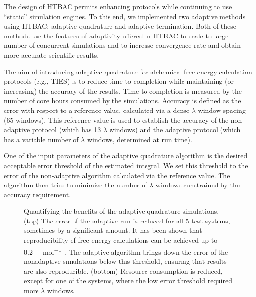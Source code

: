 The design of HTBAC permits enhancing protocols while continuing to use
``static'' simulation engines. To this end, we implemented two adaptive
methods using HTBAC: adaptive quadrature and adaptive termination. Both of
these methods use the features of adaptivity offered in HTBAC to scale to
large number of concurrent simulations and to increase convergence rate and
obtain more accurate scientific results.



The aim of introducing adaptive quadrature for alchemical free energy
calculation protocols (e.g., TIES) is to reduce time to completion while
maintaining (or increasing) the accuracy of the results. Time to completion
is measured by the number of core hours consumed by the simulations. Accuracy
is defined as the error with respect to a reference value, calculated via a
dense $\lambda$ window spacing (65 windows). This reference value is used to
establish the accuracy of the non-adaptive protocol (which has 13 $\lambda$
windows) and the adaptive protocol (which has a variable number of $\lambda$
windows, determined at run time).

One of the input parameters of the adaptive quadrature algorithm is the
desired acceptable error threshold of the estimated integral. We set this
threshold to the error of the non-adaptive algorithm calculated via the
reference value. The algorithm then tries to minimize the number of $\lambda$
windows constrained by the accuracy requirement.

\begin{figure}
  \caption{Quantifying the benefits of the adaptive quadrature simulations.
  (top) The error of the adaptive run is reduced for all 5 test systems,
  sometimes by a significant amount. It has been shown that reproducibility
  of free energy calculations can be achieved up to
  \SI{0.2}{\kilo\calorie\per\mole}~\cite{Loeffler2018}. The adaptive
  algorithm brings down the error of the nonadaptive simulations below this
  threshold, ensuring that results are also reproducible. (bottom) Resource
  consumption is reduced, except for one of the systems, where the low error
  threshold required more $\lambda$ windows.}\label{fig:savings}
\up{}
\up{}
\end{figure}

